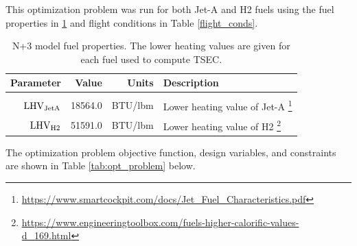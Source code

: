 \documentclass[conf]{new-aiaa}
\begin{document}
This optimization problem was run for both Jet-A and H2 fuels using the fuel properties in \ref{fuel_props} and flight conditions in Table \ref{flight_conds}.

\begin{table}[hbt!]
    \centering
    \caption{
        N+3 model fuel properties.
        The lower heating values are given for each fuel used to compute TSEC.}
    \begin{tabular}{r r r l}
        \hline
        Parameter              & Value   & Units        & Description                                                                                                            \\
        \hline                                                                                                                                                                   \\
        $\rm{LHV}_{\rm{JetA}}$ & 18564.0 & \si{BTU/lbm} & Lower heating value of Jet-A \footnote{\url{https://www.smartcockpit.com/docs/Jet_Fuel_Characteristics.pdf}}           \\
        $\rm{LHV}_{\rm{H2}}$   & 51591.0 & \si{BTU/lbm} & Lower heating value of H2 \footnote{\url{https://www.engineeringtoolbox.com/fuels-higher-calorific-values-d_169.html}} \\
        \hline
    \end{tabular}
    \label{fuel_props}
\end{table}

The optimization problem objective function, design variables, and constraints are shown in Table \ref{tab:opt_problem} below.
\end{document}
